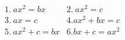 \documentclass[preview]{standalone}
\begin{document}
\begin{align*}
&1.\ ax^2 = bx    &2.\ ax^2 = c \\ &3.\ ax = c    &4. ax^2+bx = c \\ &5.\ ax^2+c = bx  &6. bx+c = ax^2
\end{align*}
\end{document}

